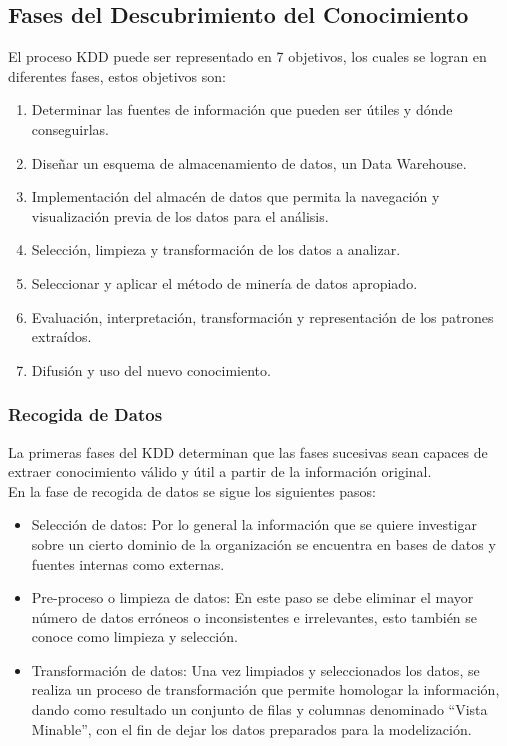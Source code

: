 \subsection{Fases del Descubrimiento del Conocimiento}

El proceso KDD puede ser representado en 7 objetivos, los cuales se logran en diferentes fases, estos objetivos son:

\begin{enumerate}
    \item Determinar las fuentes de información que pueden ser útiles y dónde conseguirlas.
    \item Diseñar un esquema de almacenamiento de datos, un Data Warehouse.
    \item Implementación del almacén de datos que permita la navegación y visualización previa de los datos para el análisis.
    \item Selección, limpieza y transformación de los datos a analizar.
    \item Seleccionar y aplicar el método de minería de datos apropiado.
    \item Evaluación, interpretación, transformación y representación de los patrones extraídos.
    \item Difusión y uso del nuevo conocimiento.
    
\end{enumerate}

\subsubsection{Recogida de Datos}

La primeras fases del KDD determinan que las fases sucesivas sean capaces de extraer conocimiento válido y útil a partir de la información original.\\

En la fase de recogida de datos se sigue los siguientes pasos:

\begin{itemize}
    \item Selección de datos: 
    Por lo general la información que se quiere investigar sobre un cierto dominio de la organización se encuentra en bases de datos y fuentes internas como externas.
    \item Pre-proceso o limpieza de datos:
    En este paso se debe eliminar el mayor número de datos erróneos o inconsistentes e irrelevantes, esto también se conoce como limpieza y selección.
    \item Transformación de datos:
    Una vez limpiados y seleccionados los datos, se realiza un proceso de transformación que permite homologar la información, dando como resultado un conjunto de filas y columnas denominado ``Vista Minable'', con el fin de dejar los datos preparados para la modelización.
\end{itemize}

